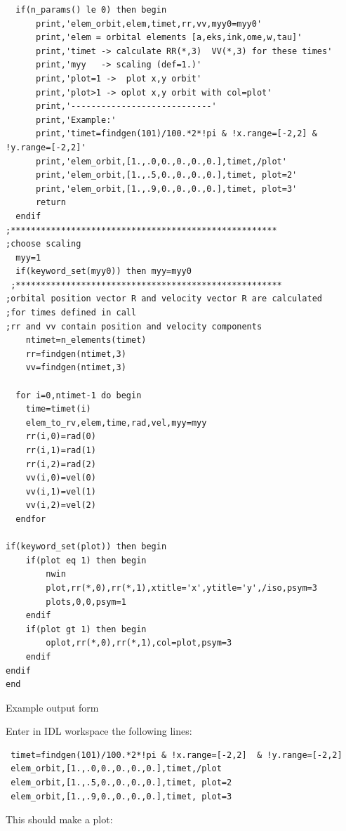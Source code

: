 \documentclass[a4paper,12pt]{article}
\def\red{\color{red}}
\def\black{\color{RGBblack}}
\begin{document}
{{{{\begin{verbatim}
  if(n_params() le 0) then begin
      print,'elem_orbit,elem,timet,rr,vv,myy0=myy0'
      print,'elem = orbital elements [a,eks,ink,ome,w,tau]'
      print,'timet -> calculate RR(*,3)  VV(*,3) for these times'
      print,'myy   -> scaling (def=1.)'
      print,'plot=1 ->  plot x,y orbit'
      print,'plot>1 -> oplot x,y orbit with col=plot'
      print,'----------------------------'
      print,'Example:'
      print,'timet=findgen(101)/100.*2*!pi & !x.range=[-2,2] & !y.range=[-2,2]'
      print,'elem_orbit,[1.,.0,0.,0.,0.,0.],timet,/plot'
      print,'elem_orbit,[1.,.5,0.,0.,0.,0.],timet, plot=2'
      print,'elem_orbit,[1.,.9,0.,0.,0.,0.],timet, plot=3'
      return
  endif
;*****************************************************
;choose scaling
  myy=1
  if(keyword_set(myy0)) then myy=myy0
 ;*****************************************************
;orbital position vector R and velocity vector R are calculated
;for times defined in call
;rr and vv contain position and velocity components
    ntimet=n_elements(timet)
    rr=findgen(ntimet,3)
    vv=findgen(ntimet,3)

  for i=0,ntimet-1 do begin
    time=timet(i)
    elem_to_rv,elem,time,rad,vel,myy=myy
    rr(i,0)=rad(0)
    rr(i,1)=rad(1)
    rr(i,2)=rad(2)
    vv(i,0)=vel(0)
    vv(i,1)=vel(1)
    vv(i,2)=vel(2)
  endfor

if(keyword_set(plot)) then begin
    if(plot eq 1) then begin  
        nwin
        plot,rr(*,0),rr(*,1),xtitle='x',ytitle='y',/iso,psym=3
        plots,0,0,psym=1
    endif
    if(plot gt 1) then begin          
        oplot,rr(*,0),rr(*,1),col=plot,psym=3
    endif
endif
end

\end{verbatim}
\black}

\newpage

\black Example output form 


Enter in IDL workspace the following lines:
\red
\begin{verbatim}
 timet=findgen(101)/100.*2*!pi & !x.range=[-2,2]  & !y.range=[-2,2]
 elem_orbit,[1.,.0,0.,0.,0.,0.],timet,/plot
 elem_orbit,[1.,.5,0.,0.,0.,0.],timet, plot=2
 elem_orbit,[1.,.9,0.,0.,0.,0.],timet, plot=3
\end{verbatim}
\black

This should make a plot:

}}}
\end{document}
